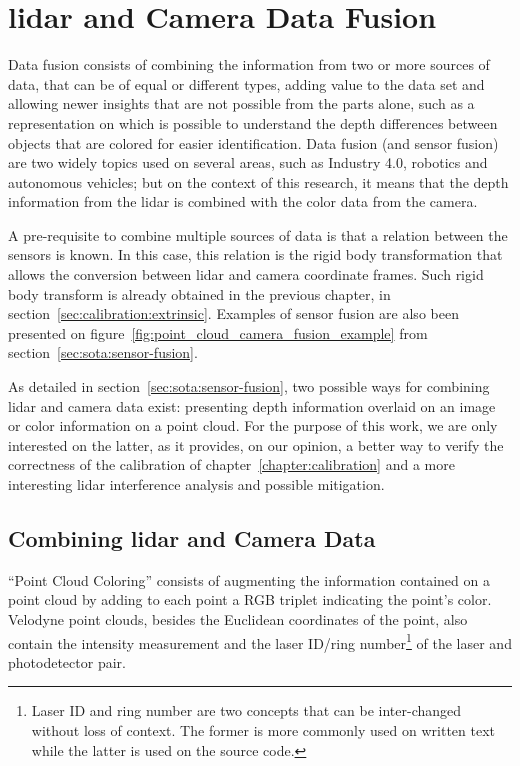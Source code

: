 \chapter{\ac{lidar} and Camera Data Fusion}
\label{chapter:sensor-fusion}

Data fusion consists of combining the information from two or more sources of data, that can be of equal or different types, adding value to the data set and allowing newer insights that are not possible from the parts alone, such as a representation on which is possible to understand the depth differences  between objects that are colored for easier identification. Data fusion (and sensor fusion) are two widely topics used on several areas, such as Industry 4.0, robotics and autonomous vehicles; but on the context of this research, it means that the depth information from the \ac{lidar} is combined with the color data from the camera.

A pre-requisite to combine multiple sources of data is that a relation between the sensors is known. In this case, this relation is the rigid body transformation that allows the conversion between \ac{lidar} and camera coordinate frames. Such rigid body transform is already obtained in the previous chapter, in section~\ref{sec:calibration:extrinsic}. Examples of sensor fusion are also been presented on figure~\ref{fig:point_cloud_camera_fusion_example} from section~\ref{sec:sota:sensor-fusion}.

As detailed in section~\ref{sec:sota:sensor-fusion}, two possible ways for combining \ac{lidar} and camera data exist: presenting depth information overlaid on an image or color information on a point cloud. For the purpose of this work, we are only interested on the latter, as it provides, on our opinion, a better way to verify the correctness of the calibration of chapter~\ref{chapter:calibration} and a more interesting \ac{lidar} interference analysis and possible mitigation.

\section{Combining \ac{lidar} and Camera Data}
``Point Cloud Coloring'' consists of augmenting the information contained on a point cloud by adding to each point a RGB triplet indicating the point's color. Velodyne point clouds, besides the Euclidean coordinates of the point, also contain the intensity measurement and the laser ID/ring number\footnote{Laser ID and ring number are two concepts that can be inter-changed without loss of context. The former is more commonly used on written text while the latter is used on the source code.} of the laser and photodetector pair.

